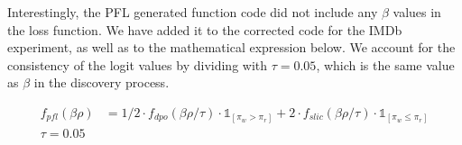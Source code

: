 \documentclass{article}
\theoremstyle{plain}
\theoremstyle{definition}
\theoremstyle{remark}
\begin{document}
Interestingly, the PFL generated function code did not include any $\beta$ values in the loss function. We have added it to the corrected code for the IMDb experiment, as well as to the mathematical expression below. We account for the consistency of the logit values by dividing with $\tau = 0.05$, which is the same value as $\beta$ in the discovery process.

\begin{align}
f_{pfl}(\beta\rho) &= 1/2\cdot f_{dpo}(\beta\rho/\tau)\cdot\mathds{1}_{[\pi_w > \pi_r]}  + 2\cdot f_{slic}(\beta\rho/\tau)\cdot \mathds{1}_{[\pi_w \leq \pi_r]}\\
\tau = 0.05
\end{align}



\end{document}
